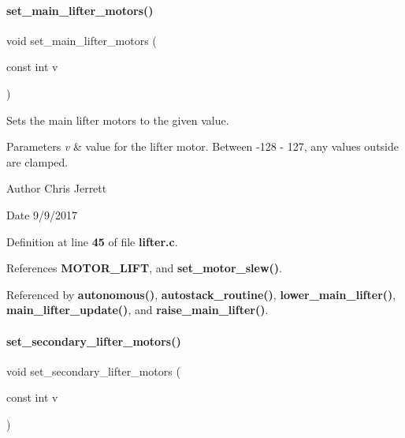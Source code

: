 \paragraph{set\+\_\+main\+\_\+lifter\+\_\+motors()}
{\footnotesize\ttfamily void set\+\_\+main\+\_\+lifter\+\_\+motors (\begin{DoxyParamCaption}\item[{const int}]{v }\end{DoxyParamCaption})}



Sets the main lifter motors to the given value. 


\begin{DoxyParams}{Parameters}
{\em v} & value for the lifter motor. Between -\/128 -\/ 127, any values outside are clamped. \\
\hline
\end{DoxyParams}
\begin{DoxyAuthor}{Author}
Chris Jerrett 
\end{DoxyAuthor}
\begin{DoxyDate}{Date}
9/9/2017 
\end{DoxyDate}


Definition at line \textbf{ 45} of file \textbf{ lifter.\+c}.



References \textbf{ M\+O\+T\+O\+R\+\_\+\+L\+I\+FT}, and \textbf{ set\+\_\+motor\+\_\+slew()}.



Referenced by \textbf{ autonomous()}, \textbf{ autostack\+\_\+routine()}, \textbf{ lower\+\_\+main\+\_\+lifter()}, \textbf{ main\+\_\+lifter\+\_\+update()}, and \textbf{ raise\+\_\+main\+\_\+lifter()}.

\mbox{\label{lifter_8c_a78640d547d9361951a92d0bc00939536}} 
\paragraph{set\+\_\+secondary\+\_\+lifter\+\_\+motors()}
{\footnotesize\ttfamily void set\+\_\+secondary\+\_\+lifter\+\_\+motors (\begin{DoxyParamCaption}\item[{const int}]{v }\end{DoxyParamCaption})}



